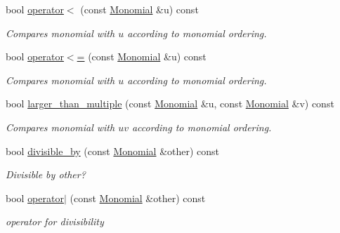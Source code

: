 \begin{Indent}
\begin{DoxyCompactItemize}
\mbox{\label{group__polygroup_a6b3223572db10a2231049f449232b19e}} 
bool \hyperlink{group__polygroup_a6b3223572db10a2231049f449232b19e}{operator$<$} (const \hyperlink{group__polygroup_class_monomial}{Monomial} \&u) const
\begin{DoxyCompactList}\small\item\em Compares monomial with $u$ according to monomial ordering. \end{DoxyCompactList}\item 
\mbox{\label{group__polygroup_a89124b9c5534435a9c044ac54705b8fc}} 
bool \hyperlink{group__polygroup_a89124b9c5534435a9c044ac54705b8fc}{operator$<$=} (const \hyperlink{group__polygroup_class_monomial}{Monomial} \&u) const
\begin{DoxyCompactList}\small\item\em Compares monomial with $u$ according to monomial ordering. \end{DoxyCompactList}\item 
\mbox{\label{group__polygroup_a1cac303db5d3cc66247137172cf84145}} 
bool \hyperlink{group__polygroup_a1cac303db5d3cc66247137172cf84145}{larger\+\_\+than\+\_\+multiple} (const \hyperlink{group__polygroup_class_monomial}{Monomial} \&u, const \hyperlink{group__polygroup_class_monomial}{Monomial} \&v) const
\begin{DoxyCompactList}\small\item\em Compares monomial with $uv$ according to monomial ordering. \end{DoxyCompactList}\item 
\mbox{\label{group__polygroup_aa0341b299fa1fcd4459f9a6810768f0e}} 
bool \hyperlink{group__polygroup_aa0341b299fa1fcd4459f9a6810768f0e}{divisible\+\_\+by} (const \hyperlink{group__polygroup_class_monomial}{Monomial} \&other) const
\begin{DoxyCompactList}\small\item\em Divisible by {\ttfamily other}? \end{DoxyCompactList}\item 
\mbox{\label{group__polygroup_a4673d0cabc6284ce01a08f6c9f71a646}} 
bool \hyperlink{group__polygroup_a4673d0cabc6284ce01a08f6c9f71a646}{operator$\vert$} (const \hyperlink{group__polygroup_class_monomial}{Monomial} \&other) const
\begin{DoxyCompactList}\small\item\em operator for divisibility \end{DoxyCompactList}\end{DoxyCompactItemize}
\end{Indent}
